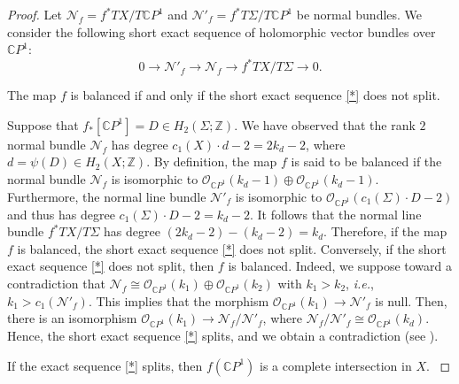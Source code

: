 \documentclass[11pt]{amsart}
\numberwithin{equation}{section}
\theoremstyle{definition}
\theoremstyle{plain}
\theoremstyle{remark}
\newenvironment{claim}[1]{\renewcommand\theinnercustomclaim{#1}\innercustomclaim}{\endinnercustomclaim}
\newcommand{\Z}{\mathbb{Z}}
\newcommand{\C}{\mathbb{C}}
\begin{document}
\begin{proof}
 Let $\mathcal{N}_f=f^*TX/T\C P^1$ and   $\mathcal{N}'_f=f^*T\Sigma/T\C P^1$ be normal bundles.
We consider the following short exact sequence of holomorphic vector bundles over $\C P^1$:
\begin{equation*}\tag{*}\label{*}
    0\longrightarrow \mathcal{N}'_f \longrightarrow \mathcal{N}_f  \longrightarrow f^*TX/T\Sigma \longrightarrow 0.
\end{equation*}

\begin{claim}{1}\label{claim3.5-1}
  The map $f$ is balanced if and only if the short exact sequence \eqref{*} does not split.
  \end{claim}

Suppose that $f_*[\C P^1]=D\in H_2(\Sigma;\Z)$.
We have observed that the rank $2$ normal bundle $\mathcal{N}_f$ has degree $c_1(X)\cdot d-2=2k_d-2$, where $d=\psi(D)\in H_2(X;\Z)$. By definition,  the map $f$ is said to be balanced if the normal bundle $\mathcal{N}_f$ is isomorphic to $\mathcal{O}_{\C P^1}(k_d-1)\oplus \mathcal{O}_{\C P^1}(k_d-1)$. Furthermore, the normal line bundle $\mathcal{N}'_f$ is isomorphic to $\mathcal{O}_{\C P^1}(c_1(\Sigma)\cdot D -2)$ and thus has degree $c_1(\Sigma)\cdot D -2=k_d-2$. It follows that the normal line bundle $f^*TX/T\Sigma$ has degree  $(2k_d-2)-(k_d-2)=k_d$. Therefore, if the map $f$ is balanced, the short exact sequence \eqref{*} does not split. Conversely, if the short exact sequence \eqref{*} does not split, then $f$ is balanced. Indeed, we suppose toward a contradiction that $\mathcal{N}_f\cong\mathcal{O}_{\C P^1}(k_1)\oplus \mathcal{O}_{\C P^1}(k_2)$ with $k_1>k_2$, \textit{i.e.}, $k_1>c_1(\mathcal{N}'_f)$. This implies that the morphism $\mathcal{O}_{\C P^1}(k_1)\to \mathcal{N}'_f$ is null. Then, there is an isomorphism $\mathcal{O}_{\C P^1}(k_1)\to \mathcal{N}_f/\mathcal{N}'_f$, where $\mathcal{N}_f/\mathcal{N}'_f\cong \mathcal{O}_{\C P^1}(k_d)$. Hence, the short exact sequence \eqref{*} splits, and we obtain a contradiction (see \cite[p.~252]{griffiths1983infinitesimal}).

\begin{claim}{2}\label{claim3.5-2}
  If the exact sequence \eqref{*}  splits, then $f(\C P^1)$ is a complete intersection in $X$.
  \end{claim}


\end{proof}
\end{document}
